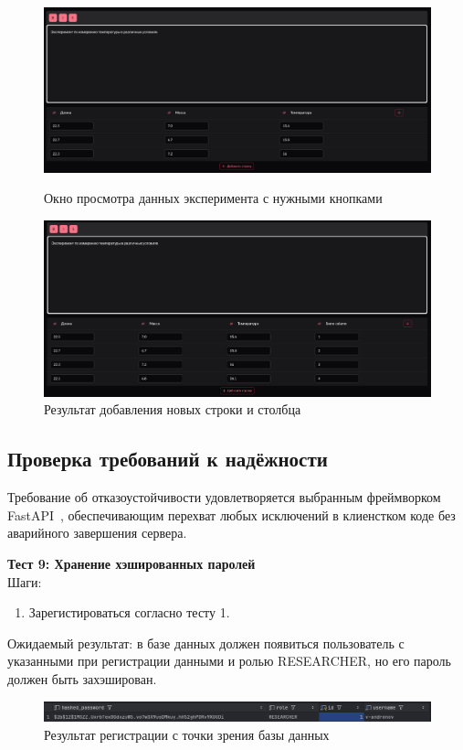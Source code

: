 \documentclass[a4paper,12pt,reqno]{article}
\begin{document}
    \begin{figure}[H]
        \centering
        \includegraphics[width=\linewidth]{img/experiment_view.png}
        \caption{Окно просмотра данных эксперимента с нужными кнопками}
        \includegraphics[width=\linewidth]{img/add_data_result.png}
        \caption{Результат добавления новых строки и столбца}
    \end{figure}
    \vspace{0.5cm}

    \subsection{Проверка требований к надёжности}

    Требование об отказоустойчивости удовлетворяется выбранным фреймворком FastAPI~\cite{Framework:FastAPI}, обеспечивающим перехват любых исключений в клиенстком коде без аварийного завершения сервера.

    \textbf{Тест 9: Хранение хэшированных паролей}\\
    Шаги:
    \begin{enumerate}
        \item Зарегистироваться согласно тесту 1.
    \end{enumerate}
    Ожидаемый результат: в базе данных должен появиться пользователь с указанными при регистрации данными и ролью RESEARCHER, но его пароль должен быть захэширован.

    \begin{figure}[H]
        \centering
        \includegraphics[width=\linewidth]{img/hashed_password.png}
        \caption{Результат регистрации с точки зрения базы данных}
    \end{figure}
    \vspace{0.5cm}

    \newpage
    \printbibliography[title=Список источников, heading=bibintoc]

    \newpage
    \listRegistration
\end{document}
